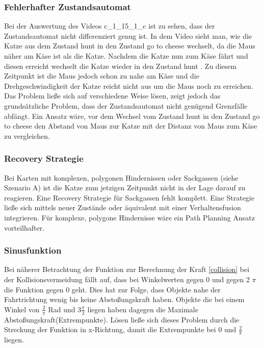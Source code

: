 \documentclass[
a4paper,     %
12pt         %
]{scrartcl}  %
\begin{document}
\subsubsection{Fehlerhafter Zustandsautomat}
Bei der Auswertung des Videos c\_1\_15\_1\_c  ist zu sehen, dass der Zustandsautomat nicht differenziert genug ist. In dem Video sieht man, wie die Katze aus dem Zustand \glqq hunt\grqq{} in den Zustand \glqq go to cheese\grqq{} wechselt, da die Maus näher am Käse ist als die Katze. Nachdem die Katze nun zum Käse fährt und diesen erreicht wechselt die Katze wieder in den Zustand \glqq hunt \grqq{}. Zu diesem Zeitpunkt ist die Maus jedoch schon zu nahe am Käse und die Drehgeschwindigkeit der Katze reicht nicht aus um die Maus noch zu erreichen.
Das Problem ließe sich auf verschiedene Weise lösen, zeigt jedoch das grundsätzliche Problem, dass der Zustandsautomat nicht genügend Grenzfälle abfängt. Ein Ansatz wäre, vor dem Wechsel  vom Zustand \glqq hunt \grqq{} in den Zustand \glqq go to cheese\grqq{} den Abstand von Maus zur Katze mit der Distanz von Maus zum Käse zu vergleichen.
\subsubsection{Recovery Strategie}
Bei Karten mit komplexen, polygonen Hindernissen oder Sackgassen (siehe Szenario A) ist die Katze zum jetzigen Zeitpunkt nicht in der Lage darauf zu reagieren. Eine Recovery Strategie für Sackgassen fehlt komplett. Eine Strategie ließe sich mittels neuer Zustände oder äquivalent mit einer Verhaltensfusion integrieren. Für komplexe, polygone Hindernisse wäre ein Path Planning Ansatz vorteilhafter.
\subsubsection{Sinusfunktion}
Bei näherer Betrachtung der Funktion zur Berechnung der Kraft \ref{collision} bei der Kollisionsvermeidung fällt auf, dass bei Winkelwerten gegen 0 und gegen 2 $\pi$ die Funktion gegen 0 geht. Dies hat zur Folge, dass Objekte nahe der Fahrtrichtung wenig bis keine Abstoßungskraft haben.  Objekte die bei einem Winkel von $ \frac{2}{\pi}$ Rad und $3 \frac{\pi}{2} $   liegen haben dagegen die Maximale Abstoßungskraft(Extrempunkte).
Lösen ließe sich dieses Problem durch die Streckung der Funktion in x-Richtung, damit die Extrempunkte bei 0 und $ \frac{2}{\pi}$ liegen.
\end{document}
